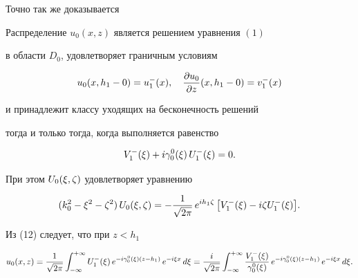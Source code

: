 Точно так же доказывается





\begin{lem}


Распределение $u_0(x,z)$ является решением уравнения $(1)$


в области $D_0$, удовлетворяет граничным условиям


\begin{equation}


u_0(x,h_1-0) = u^-_1(x),\quad


\frac{\pa u_0}{\pa z}(x,h_1-0) = v^-_1(x)


\end{equation}


и принадлежит классу уходящих на бесконечность решений


тогда и только тогда, когда выполняется равенство


\begin{equation}


V^-_1(\xi)+i\gaoxi{0}\,U^-_1(\xi) = 0 .


\end{equation}


При этом $U_0(\xi,\zeta)$ удовлетворяет уравнению


\begin{equation}


(k_0^2-\xi^2-\dz^2)\,U_0(\xi,\dz) =


- \frac{1}{\sqrt{2\pi}}\,e^{ih_1\dz}\,


\bigl[ V^-_1(\xi)-i\dz U^-_1(\xi) \bigr] .


\end{equation}


\end{lem}





Из (12) следует, что при $z<h_1$


\begin{equation}


u_0(x,z) =


\frac{1}{\sqrt{2\pi}}


\int_{-\infty}^{+\infty} U^-_1(\xi)\,


e^{-i\gaoxi{0}(z-h_1)}\,e^{-i\xi x}\,d\xi


= \frac{i}{\sqrt{2\pi}}


\int_{-\infty}^{+\infty} \frac{V^-_1(\xi)}{\gaoxi{0}}\,


e^{-i\gaoxi{0}(z-h_1)}\,e^{-i\xi x}\,d\xi .


\end{equation}








